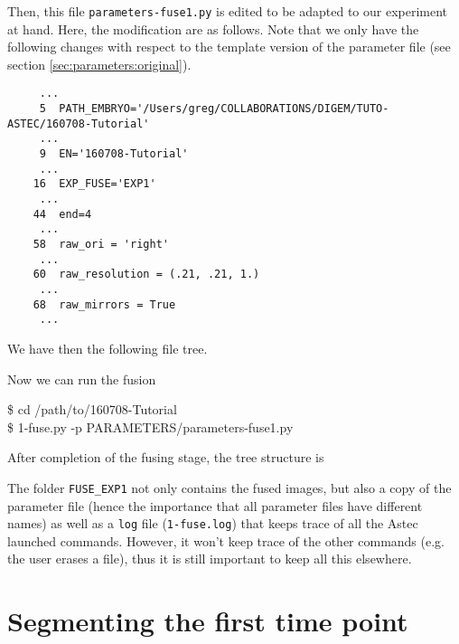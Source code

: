 Then, this file \texttt{parameters-fuse1.py} is edited to be adapted to our experiment at hand. Here, the modification are as follows. Note that we only have the following changes with respect to the template version of the parameter file (see section \ref{sec:parameters:original}).

\begin{verbatim}
     ...
     5	PATH_EMBRYO='/Users/greg/COLLABORATIONS/DIGEM/TUTO-ASTEC/160708-Tutorial'	
     ...
     9	EN='160708-Tutorial'			
     ... 
    16	EXP_FUSE='EXP1'	
     ...
    44	end=4   				 
     ...
    58	raw_ori = 'right' 				
     ...
    60	raw_resolution = (.21, .21, 1.) 
     ...
    68	raw_mirrors = True  			
     ...
\end{verbatim}

We have then the following file tree.


Now we can run the fusion

\begin{code}{0.8}
\$ cd /path/to/160708-Tutorial\\
\$ 1-fuse.py -p PARAMETERS/parameters-fuse1.py 
\end{code}

After completion of the fusing stage, the tree structure is 

The folder \texttt{FUSE\_EXP1} not only contains the fused images, but also a copy of the parameter file (hence the importance that all parameter files have different names) as well as a \texttt{log} file (\texttt{1-fuse.log}) that keeps trace of all the Astec launched commands. However, it won't keep trace of the other commands (e.g. the user erases a file), thus it is still important to keep all this elsewhere.










\section{Segmenting the first time point}

